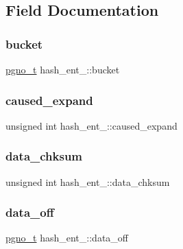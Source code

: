 \subsection{Field Documentation}
\mbox{\label{structhash__ent___ae2b9802542ef673d965ee83cb4d755f2}} 
\subsubsection{\texorpdfstring{bucket}{bucket}}
{\footnotesize\ttfamily \mbox{\hyperlink{adat-devel_2other__libs_2filedb_2filehash_2ffdb__db_8h_a000813331643d38481142bcce7de1501}{pgno\+\_\+t}} hash\+\_\+ent\+\_\+\+::bucket}

\mbox{\label{structhash__ent___ad466c754efc662c05b8d952ec59314c7}} 
\subsubsection{\texorpdfstring{caused\_expand}{caused\_expand}}
{\footnotesize\ttfamily unsigned int hash\+\_\+ent\+\_\+\+::caused\+\_\+expand}

\mbox{\label{structhash__ent___ac8938cc10c673879a50a0f291713683e}} 
\subsubsection{\texorpdfstring{data\_chksum}{data\_chksum}}
{\footnotesize\ttfamily unsigned int hash\+\_\+ent\+\_\+\+::data\+\_\+chksum}

\mbox{\label{structhash__ent___aeddaa6eeb9c67da3640950876fa466ba}} 
\subsubsection{\texorpdfstring{data\_off}{data\_off}}
{\footnotesize\ttfamily \mbox{\hyperlink{adat-devel_2other__libs_2filedb_2filehash_2ffdb__db_8h_a000813331643d38481142bcce7de1501}{pgno\+\_\+t}} hash\+\_\+ent\+\_\+\+::data\+\_\+off}

